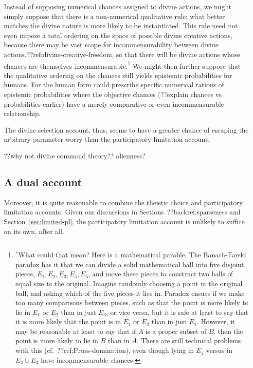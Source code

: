 Instead of supposing numerical chances assigned to divine actions, we might simply suppose that there is a non-numerical qualitative 
rule: what better matches the divine nature is more likely to be instantiated. This rule need not even impose a total ordering on the
space of possible divine creative actions, because there may be vast scope for incommensurability between divine actions.??ref:divine-creative-freedom,
so that there will be divine actions whose chances are themselves incommensurable.\footnote{$^*$What could that mean? Here is a mathematical
parable. The Banach-Tarski paradox has it that we can divide a solid mathematical ball into five disjoint pieces, $E_1,E_2,E_3,E_4,E_5$, and move these pieces to 
construct two balls of equal size to the original. Imagine randomly choosing a point in the original ball, and asking which of the
five pieces it lies in. Paradox ensues if we make too many comparisons between pieces, such as that the point is more likely to lie in 
$E_1$ or $E_2$ than in just $E_3$, or vice versa, but it is safe at least to say that it is more likely that the point is in $E_1$ or $E_2$
than in just $E_1$. However, it may be reasonable at least to say that if $A$ is a proper subset of $B$, then the point is more likely to lie in $B$ than
in $A$. There are still technical problems with this (cf.\ ??ref:Pruss-domination), even though lying in $E_1$ versus in $E_2\cup E_3$ have
incommensurable chances.} We might then further suppose that the qualitative ordering on the chances still yields epistemic probabilities for humans. For
the human form could prescribe specific numerical rations of epistemic probabilities where the objective chances (??explain chances vs probabilities earlier) 
have a merely comparative or even incommensurable relationship.

The divine selection account, thus, seems to have a greater chance of escaping the arbitrary parameter worry than the 
participatory limitation account.

??why not divine command theory?? alienness?

\subsection{A dual account}
Moreover, it is quite reasonable to combine the theistic choice and participatory limitation accounts. Given our discussions in Sections~??backref:sparseness and Section~\ref{sec:limited-pl}, the participatory limitation account is unlikely to suffice on its own, after all.

